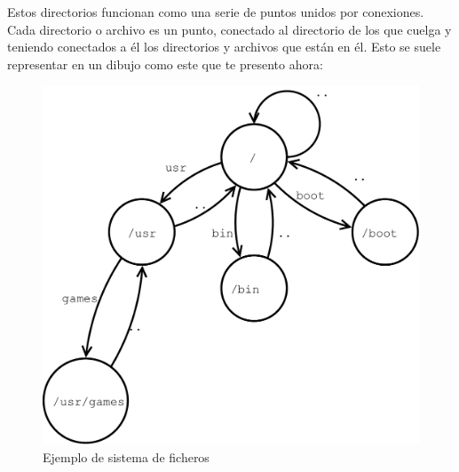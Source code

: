\documentclass[a4paper]{article}
\begin{document}
Estos directorios funcionan como una serie de puntos unidos por conexiones.
Cada directorio o archivo es un punto, conectado al directorio de los que
cuelga y teniendo conectados a él los directorios y archivos que están en él.
Esto se suele representar en un dibujo como este que te presento ahora:

\begin{figure}[H]
    \includegraphics[width=\linewidth]{filesystems}
    \caption{Ejemplo de sistema de ficheros}
    \label{img:extensions}
\end{figure}
\end{document}
